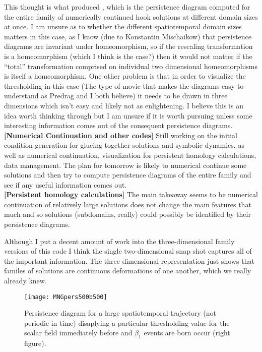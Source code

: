 \begin{description}
{This thought is what produced , which is the
persistence diagram computed for the entire family of numerically continued hook
solutions at different domain sizes at once. I am unsure as to whether the
different spatiotemporal domain sizes matters in this case, as I know (due to
Konstantin Mischaikow) that persistence diagrams are invariant under
homeomorphism, so if the rescaling transformation is a homeomorphism (which I
think is the case?) then it would not matter if the ``total'' transformation
comprised on individual two dimensional homeomorphisms is itself a homeomorphism.
One other problem is that in order to visualize the thresholding in this case
(The type of movie that makes the diagrams easy to understand as Predrag and I
both believe) it needs to be drawn in three dimensions which isn't easy and
likely not as enlightening. I believe this is an idea worth thinking through but
I am unsure if it is worth pursuing unless some interesting information comes out
of the consequent persistence diagrams.
\\

{\bf [Numerical Continuation and other codes]}
Still working on the initial condition generation for glueing together solutions
and symbolic dynamics, as well as numerical continuation, visualization for
persistent homology calculations, data management. The plan for tomorrow is
likely to numerical continue some solutions and then try to compute persistence
diagrams of the entire family and see if any useful information comes out.
\\

{\bf [Persistent homology calculations]}
The main takeaway seems to be numerical continuation of relatively large
solutions does not change the main features that much and so solutions
(subdomains, really) could possibly be identified by their persistence diagrams.

Although I put a decent amount of work into the three-dimensional family
versions of this code I think the single two-dimensional snap shot captures
all of the important information. The three dimensional representation just
shows that familes of solutions are continuous deformations of one another,
which we really already knew.

}

\begin{figure}[ht]
\begin{minipage}[height=.32\textheight]{1.0\textwidth}
\centering %
\texttt{[image: MNGpers500b500]}
\end{minipage}
\caption{ \label{fig:MNGpers500b500}
Persistence diagram for a large spatiotemporal trajectory (not periodic in time)
disaplying a particular thresholding value for the scalar field immediately
before and $\beta_1$ events are born occur (right figure).
}
\end{figure}


\end{description}
